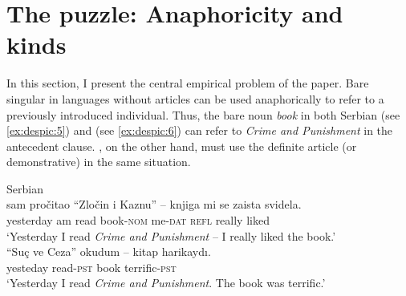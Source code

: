 \documentclass[output=paper,
modfonts
]{langscibook}
\begin{document}
	\section{The puzzle: Anaphoricity and kinds } \label{sec:despic:2}
	
	In this section, I present the central empirical problem of the paper. Bare singular  in languages without articles can be used anaphorically to refer to a previously introduced individual. Thus, the bare noun \textit{book} in both Serbian (see \ref{ex:despic:5}) and  (see \ref{ex:despic:6}) can refer to \textit{Crime and Punishment} in the antecedent clause. , on the other hand, must use the definite article (or demonstrative) in the same situation. 
	
	\ea \label{ex:despic:5}
	Serbian \\
	  {sam} {pro\v citao} {``Zlo\v cin   i      Kaznu''} --     {knjiga}       {mi}        {se} {zaista} {svidela}. \\
	yesterday am   read  \phantom{``}{Crime and Punishment}  {} book-\textsc{nom} me-\textsc{dat} \textsc{refl} really liked\\ 
	\glt `Yesterday I read \textit{Crime and Punishment} -- I really liked the book.'
	\z 
	\vspace{-.5\baselineskip}\largerpage[2]%
	\ea \label{ex:despic:6}
	 \\
	         {``Su\c c      ve   Ceza''}          {okudum} --   {kitap} {harikayd\i}.\\
	yesteday \phantom{``}{Crime and Punishment} read-\textsc{pst} {} book terrific-\textsc{pst}\\ 
	\glt `Yesterday I read \textit{Crime and Punishment}. The book was terrific.'
	\z 
	
\end{document}
